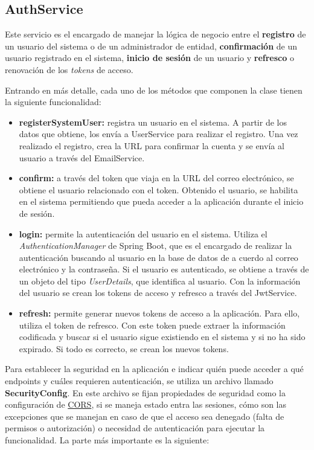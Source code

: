 \subsection{AuthService}

Este servicio es el encargado de manejar la lógica de negocio entre el \textbf{registro} de un usuario del sistema o de un administrador de entidad, \textbf{confirmación} de un usuario registrado en el 
sistema, \textbf{inicio de sesión} de un usuario y \textbf{refresco} o renovación de los \textit{tokens} de acceso.

Entrando en más detalle, cada uno de los métodos que componen la clase tienen la siguiente funcionalidad:

\begin{itemize}
    \item \textbf{registerSystemUser:} registra un usuario en el sistema. A partir de los datos que obtiene, los envía a UserService para realizar el registro. Una vez realizado el registro, crea la URL
    para confirmar la cuenta y se envía al usuario a través del EmailService.

    \item \textbf{confirm:} a través del token que viaja en la URL del correo electrónico, se obtiene el usuario relacionado con el token. Obtenido el usuario, se habilita en el sistema permitiendo que 
    pueda acceder a la aplicación durante el inicio de sesión.

    \item \textbf{login:} permite la autenticación del usuario en el sistema. Utiliza el \textit{AuthenticationManager} de Spring Boot, que es el encargado de realizar la autenticación buscando al usuario
    en la base de datos de a cuerdo al correo electrónico y la contraseña. Si el usuario es autenticado, se obtiene a través de un objeto del tipo \textit{UserDetails}, que identifica al usuario. Con la 
    información del usuario se crean los tokens de acceso y refresco a través del JwtService. 

    \item \textbf{refresh:} permite generar nuevos tokens de acceso a la aplicación. Para ello, utiliza el token de refresco. Con este token puede extraer la información codificada y buscar si el usuario 
    sigue existiendo en el sistema y si no ha sido expirado. Si todo es correcto, se crean los nuevos tokens.
\end{itemize}

Para establecer la seguridad en la aplicación e indicar quién puede acceder a qué endpoints y cuáles requieren autenticación, se utiliza un archivo llamado \textbf{SecurityConfig}. En este archivo se fijan 
propiedades de seguridad como la configuración de \hyperlink{cors}{CORS}, si se maneja estado entra las sesiones, cómo son las excepciones que se manejan en caso de que el acceso sea denegado (falta de 
permisos o autorización) o necesidad de autenticación para ejecutar la funcionalidad. La parte más importante es la siguiente:

